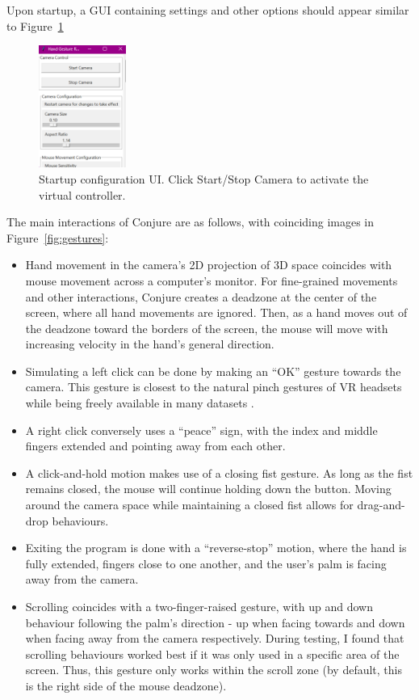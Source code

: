 \documentclass{article}
\begin{document}
Upon startup, a GUI containing settings and other options should appear similar to Figure~\ref{fig:config}
\begin{figure}
    \centering
    \includegraphics[height=4cm]{config.png}
    \caption{Startup configuration UI. Click Start/Stop Camera to activate the virtual controller.}
    \label{fig:config}
\end{figure}

The main interactions of Conjure are as follows, with coinciding images in Figure~\ref{fig:gestures}:
\begin{itemize}
    \item Hand movement in the camera's 2D projection of 3D space coincides with mouse movement across a computer's monitor. For fine-grained movements and other interactions, Conjure creates a deadzone at the center of the screen, where all hand movements are ignored. Then, as a hand moves out of the deadzone toward the borders of the screen, the mouse will move with increasing velocity in the hand's general direction.
    \item Simulating a left click can be done by making an ``OK'' gesture towards the camera. This gesture is closest to the natural pinch gestures of VR headsets while being freely available in many datasets \cite{Alexander_2024, nuzhdin2024hagridv21mimagesstatic, zimmermann2017learningestimate3dhand, gesture_recognizer}.
    \item A right click conversely uses a ``peace'' sign, with the index and middle fingers extended and pointing away from each other.
    \item A click-and-hold motion makes use of a closing fist gesture. As long as the fist remains closed, the mouse will continue holding down the button. Moving around the camera space while maintaining a closed fist allows for drag-and-drop behaviours.
    \item Exiting the program is done with a ``reverse-stop'' motion, where the hand is fully extended, fingers close to one another, and the user's palm is facing away from the camera.
    \item Scrolling coincides with a two-finger-raised gesture, with up and down behaviour following the palm's direction - up when facing towards and down when facing away from the camera respectively. During testing, I found that scrolling behaviours worked best if it was only used in a specific area of the screen. Thus, this gesture only works within the scroll zone (by default, this is the right side of the mouse deadzone).
\end{itemize}
\end{document}
